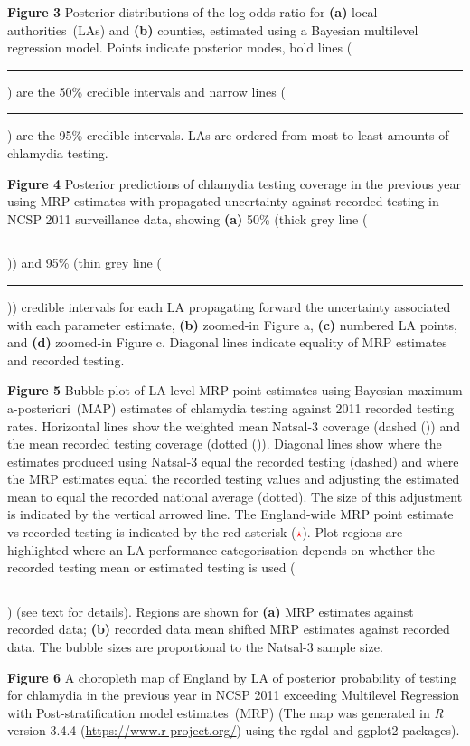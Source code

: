 \documentclass[fleqn,10pt]{wlscirep}
\begin{document}
\textbf{Figure 3} Posterior distributions of the log odds ratio for {\bf (a)} local authorities~(LAs) and {\bf (b)} counties, estimated using a Bayesian multilevel regression model. Points indicate posterior modes, bold lines (\rule[0.3ex]{0.3cm}{1.5pt}) are the 50\% credible intervals and narrow lines (\rule[0.3ex]{0.3cm}{0.5pt}) are the 95\% credible intervals. LAs are ordered from most to least amounts of chlamydia testing.

\textbf{Figure 4} Posterior predictions of chlamydia testing coverage in the previous year using MRP estimates with propagated uncertainty against recorded testing in NCSP 2011 surveillance data, showing {\bf (a)} 50\% (thick grey line (\textcolor{gray}{\rule[0.3ex]{0.3cm}{1.5pt}})) and 95\% (thin grey line (\textcolor{gray}{\rule[0.3ex]{0.3cm}{0.5pt}})) credible intervals for each LA propagating forward the uncertainty associated with each parameter estimate, {\bf (b)} zoomed-in Figure a, {\bf (c)} numbered LA points, and {\bf (d)} zoomed-in Figure c. Diagonal lines indicate equality of MRP estimates and recorded testing.

\textbf{Figure 5} Bubble plot of LA-level MRP point estimates using Bayesian maximum a-posteriori~(MAP) estimates of chlamydia testing against 2011 recorded testing rates. Horizontal lines show the weighted mean Natsal-3 coverage (dashed (\hdashrule{7mm}{0.5pt}{1.0mm})) and the mean recorded testing coverage (dotted (\hdashrule{5mm}{0.5pt}{0.5mm})). Diagonal lines show where the estimates produced using Natsal-3 equal the recorded testing (dashed) and where the MRP estimates equal the recorded testing values and adjusting the estimated mean to equal the recorded national average (dotted). The size of this adjustment is indicated by the vertical arrowed line. The England-wide MRP point estimate vs recorded testing is indicated by the red asterisk (\textcolor{red}{$\star$}). Plot regions are highlighted where an LA performance categorisation depends on whether the recorded testing mean or estimated testing is used (\textcolor{Mycolor2}{\rule{3mm}{2.5mm}}) (see text for details). Regions are shown for {\bf (a)} MRP estimates against recorded data; {\bf (b)} recorded data mean shifted MRP estimates against recorded data. The bubble sizes are proportional to the Natsal-3 sample size.

\textbf{Figure 6} A choropleth map of England by LA of posterior probability of testing for chlamydia in the previous year in NCSP 2011 exceeding Multilevel Regression with Post-stratification model estimates~(MRP) (The map was generated in {\it R} version 3.4.4 (\url{https://www.r-project.org/}) using the rgdal and ggplot2 packages).
\end{document}
